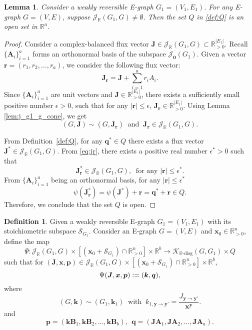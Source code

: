 \documentclass[11pt]{article}
\theoremstyle{plain}
\newtheorem{lemma}[theorem]{Lemma}
\theoremstyle{definition}
\newtheorem{definition}[theorem]{Definition}
\theoremstyle{remark}
\newcommand\RR{\mathbb{R}}
\newcommand\by{\boldsymbol{y}}
\newcommand\bk{\boldsymbol{k}}
\newcommand\bx{\boldsymbol{x}}
\newcommand\bA{\boldsymbol{A}}
\newcommand\bB{\boldsymbol{B}}
\newcommand\bq{\boldsymbol{q}}
\newcommand\bp{\boldsymbol{p}}
\newcommand\br{\boldsymbol{r}}
\newcommand\bJ{\boldsymbol{J}}
\newcommand{\dK}{\mathcal{K}_{\RR\text{-disg}}}
\newcommand{\mJ}{\mathcal{J}_{\RR}}
\newcommand{\eJ}{\mathcal{J}_{\textbf{0}}}
\newcommand{\mS}{\mathcal{S}}
\begin{document}
\begin{lemma}
\label{lem:Q_open}
Consider a weakly reversible E-graph $G_1 = (V_1, E_1)$. For any E-graph $G = (V, E)$, suppose $\mJ(G_1,G) \neq \emptyset$. Then the set 
$Q$
in \eqref{def:Q} is an open set in $\RR^a$.
\end{lemma}

\begin{proof} 
Consider a complex-balanced flux vector $\bJ \in \mJ(G_1,G) \subset \RR^{|E_1|}_{>0}$.
Recall $\{\bA_i\}^a_{i=1}$ forms an orthonormal basis of the subspace $\eJ(G_1)$. Given a vector $\br = (r_1, r_2, \ldots, r_a)$, we consider the following flux vector:
\[
\bJ_{\br} = \bJ + \sum\limits^a_{i=1} r_i A_i.
\]
Since $\{\bA_i\}^a_{i=1}$ are unit vectors and $\bJ \in \RR^{|E_1|}_{>0}$, there exists a sufficiently small positive number $\epsilon > 0$, such that for any $|\br| \leq \epsilon$, $\bJ_{\br} \in \RR^{|E_1|}_{>0}$.
Using Lemma \ref{lem:j_g1_g_cone}, we get
\begin{equation} \label{eq:jr}
(G, \bJ) \sim (G, \bJ_{\br}) 
\ \text{ and } \ 
\bJ_{\br} \in \mJ(G_1,G).
\end{equation}

From Definition~\ref{def:Q}, for any $\bq^* \in Q$ there exists a flux vector $\bJ^* \in \mJ(G_1,G)$.
From \eqref{eq:jr}, there exists a  positive real number $\epsilon^* > 0$ such that
\[
\bJ^*_{\br} \in \mJ(G_1,G),
\ \text{ for any }
|\br| \leq \epsilon^*.
\]
From $\{\bA_i\}^a_{i=1}$ being an orthonormal basis, for any $|\br| \leq \epsilon^*$
\[
\psi (\bJ^*_{\br}) = \psi (\bJ^*) + \br = \bq^* + \br \in Q.
\]
Therefore, we conclude that the set $Q$ is open.
\end{proof}

\begin{definition} \label{def:psi}
Given a weakly reversible E-graph $G_1 = (V_1, E_1)$ with its stoichiometric subspace $\mS_{G_1}$.
Consider an E-graph $G = (V, E)$ and $\bx_0\in\mathbb{R}^n_{>0}$, define the map 
\begin{equation} \label{eq:psi}
\Psi: \mJ(G_1,G)\times [(\bx_0 + \mS_{G_1} )\cap\mathbb{R}^n_{>0}] \times \mathbb{R}^b \rightarrow \dK(G,G_1) \times Q
\end{equation}
such that for $(\bJ, \bx, \bp) \in \mJ(G_1,G)\times [(\bx_0 + \mS_{G_1} )\cap\mathbb{R}^n_{>0}] \times \mathbb{R}^b$, 
\begin{equation} \notag
\Psi(\bJ,\bx, \bp) := (\bk, \bq),
\end{equation}
where 
\begin{equation} \label{def:psi_k}
(G, \bk) \sim (G_1, \bk_1) \ \text{ with } \ k_{1, \by\rightarrow \by'} = \frac{J_{\by\rightarrow \by'}}{{\bx}^{\by}}.
\end{equation} 
and
\begin{equation} \label{def:psi_kq}
\bp = (\bk \bB_1, \bk \bB_2, \ldots, \bk \bB_b), \ \
\bq = (\bJ \bA_1, \bJ \bA_2, \ldots, \bJ \bA_a).
\end{equation}
\end{definition}
\end{document}
